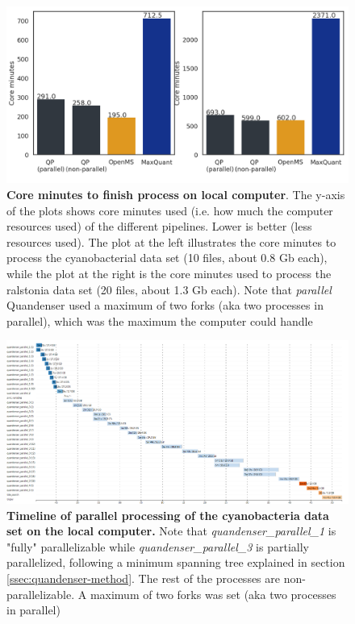 \begin{figure}[H]
  \includegraphics[width=\linewidth]{results/times_core.png}
  \caption{\textbf{Core minutes to finish process on local computer}. The y-axis of the plots shows core minutes used (i.e. how much the computer resources used) of the different pipelines. Lower is better (less resources used). The plot at the left illustrates the core minutes to process the cyanobacterial data set (10 files, about 0.8 Gb each), while the plot at the right is the core minutes used to process the ralstonia data set (20 files, about 1.3 Gb each). Note that \textit{parallel} Quandenser used a maximum of two forks (aka two processes in parallel), which was the maximum the computer could handle}
  \label{fig:processing-local-cores}
\end{figure}


\begin{figure}[H]
  \includegraphics[width=\linewidth]{results/timeline-local.png}
  \caption{\textbf{Timeline of parallel processing of the cyanobacteria data set on the local computer.} Note that \textit{quandenser\_parallel\_1} is "fully" parallelizable while \textit{quandenser\_parallel\_3} is partially parallelized, following a minimum spanning tree explained in section \ref{ssec:quandenser-method}. The rest of the processes are non-parallelizable. A maximum of two forks was set (aka two processes in parallel)}
  \label{fig:timeline-local}
\end{figure}

